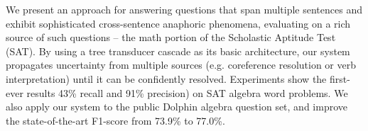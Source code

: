 We present an approach for answering questions that span multiple sentences and exhibit sophisticated cross-sentence anaphoric phenomena, evaluating on a rich source of such questions -- the math portion of the Scholastic Aptitude Test (SAT). By using a tree transducer cascade as its basic architecture, our system propagates uncertainty from multiple sources (e.g. coreference resolution or verb interpretation) until it can be confidently resolved. Experiments show the first-ever results 43\% recall and 91\% precision) on SAT algebra word problems. We also apply our system to the public Dolphin algebra question set, and improve the state-of-the-art F1-score from 73.9\% to 77.0\%.
